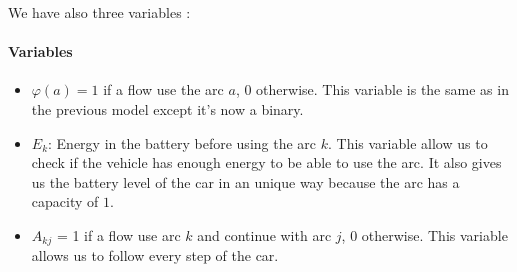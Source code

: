 \begin{bibunit}[ieeetr]
We have also three variables :
\paragraph{Variables}
\begin{itemize}
\item
$ \varphi (a) = 1 $ if a flow use the arc $a$, $0$ otherwise.
This variable is the same as in the previous model except it's now a binary.
\item
$E_k$: Energy in the battery before using the arc $k$.
This variable allow us to check if the vehicle has enough energy to be able to use the arc.
It also gives us the battery level of the car in an unique way because the arc has a capacity of $1$.
\item
$A_{kj}$ = 1 if a flow use arc $k$ and continue with arc $j$, $0$ otherwise.
This variable allows us to follow every step of the car.
\end{itemize}


\end{bibunit}
